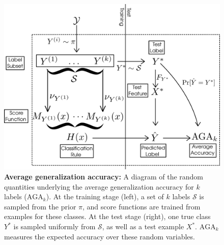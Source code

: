 \documentclass[twoside,11pt]{article}
\begin{document}
\begin{figure}[t]
\centering
\includegraphics[scale = 0.3]{average_risk.png}
\caption{\textbf{Average generalization accuracy:} A diagram of the random quantities underlying the average generalization accuracy for $k$ labels ($\text{AGA}_k$). At the training stage (left), a set of $k$ labels $\mathcal{S}$ is sampled from the prior $\pi$, and score functions are trained from examples for these classes. At the test stage (right), one true class $Y^*$ is sampled uniformly from $\mathcal{S}$, as well as a test example $X^*$. $\text{AGA}_k$ measures the expected accuracy over these random variables.}\label{fig:average_risk}
\end{figure}

\end{document}
